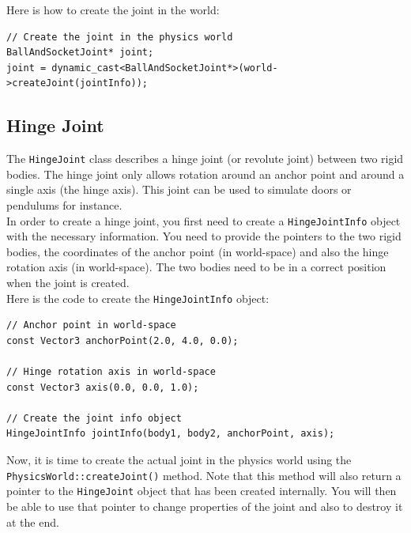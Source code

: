 \documentclass[a4paper,12pt]{article}
\begin{document}
    Here is how to create the joint in the world: \\

    \begin{lstlisting}
// Create the joint in the physics world
BallAndSocketJoint* joint;
joint = dynamic_cast<BallAndSocketJoint*>(world->createJoint(jointInfo));
  \end{lstlisting}

    \vspace{0.6cm}

    \subsection{Hinge Joint}

    The \texttt{HingeJoint} class describes a hinge joint (or revolute joint) between two rigid bodies. The hinge joint only allows rotation around an
    anchor point and around a single axis (the hinge axis). This joint can be used to simulate doors or pendulums for instance. \\

    In order to create a hinge joint, you first need to create a \texttt{HingeJointInfo} object with the necessary information. You need to provide
    the pointers to the two rigid bodies, the coordinates of the anchor point (in world-space) and also the hinge rotation axis (in world-space). The
    two bodies need to be in a correct position when the joint is created. \\

    Here is the code to create the \texttt{HingeJointInfo} object: \\

    \begin{lstlisting}
// Anchor point in world-space
const Vector3 anchorPoint(2.0, 4.0, 0.0);

// Hinge rotation axis in world-space
const Vector3 axis(0.0, 0.0, 1.0);

// Create the joint info object
HingeJointInfo jointInfo(body1, body2, anchorPoint, axis);
  \end{lstlisting}

    \vspace{0.6cm}

    \begin{sloppypar}
    Now, it is time to create the actual joint in the physics world using the \texttt{PhysicsWorld::createJoint()} method.
    Note that this method will also return a pointer to the \texttt{HingeJoint} object that has been created internally. You will then
    be able to use that pointer to change properties of the joint and also to destroy it at the end. \\
    \end{sloppypar}
\end{document}
